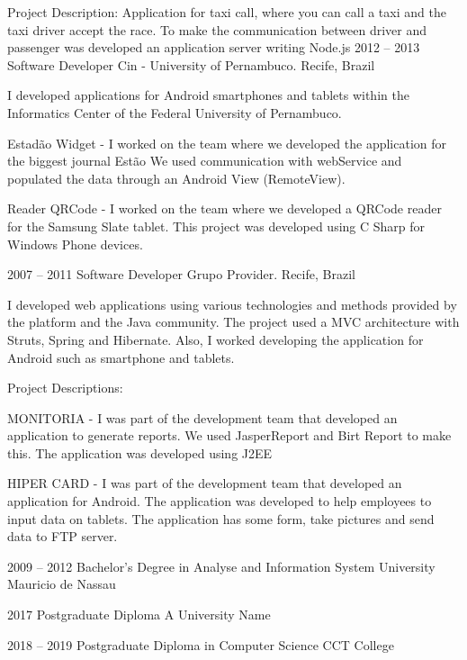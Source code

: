 \documentclass[9pt]{developercv} %
\begin{document}
\begin{entrylist}
{Project Description:
Application for taxi call, where you can call a taxi and the taxi driver accept the race. To make the communication between driver and passenger was developed an application server writing Node.js}
\entry
		{2012 -- 2013}
		{Software Developer}
		{Cin - University of Pernambuco. Recife, Brazil}
		{I developed applications for Android smartphones and tablets within the Informatics Center of the Federal University of Pernambuco.

Estadão Widget - I worked on the team where we developed the application for the biggest journal Estão We used communication with webService and populated the data through an Android View (RemoteView).

Reader QRCode - I worked on the team where we developed a QRCode reader for the Samsung Slate tablet. This project was developed using C Sharp for Windows Phone devices.}
\entry
		{2007 -- 2011}
		{Software Developer}
		{Grupo Provider. Recife, Brazil}
		{I developed web applications using various technologies and methods provided by the platform and the Java community. The project used a MVC architecture with Struts, Spring and Hibernate. Also, I worked developing the application for Android such as smartphone and tablets.

Project Descriptions:

MONITORIA - I was part of the development team that developed an application to generate reports. We used JasperReport and Birt Report to make this. The application was developed using J2EE

HIPER CARD - I was part of the development team that developed an application for Android. The application was developed to help employees to input data on tablets. The application has some form, take pictures and send data to FTP server.}
\end{entrylist}



\begin{entrylist}
	\entry
		{2009 -- 2012}
		{Bachelor's Degree in  Analyse and Information System}
		{University Mauricio de Nassau }
		
	\entry
		{2017}
		{Postgraduate Diploma}
		{A University Name}
		
	\entry
		{2018 -- 2019}
		{Postgraduate Diploma in Computer Science}
		{CCT College}
		
\end{entrylist}
\end{document}
